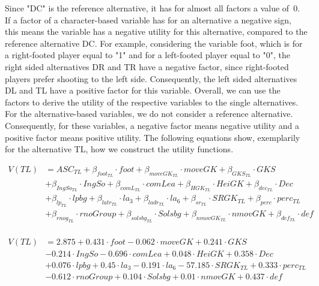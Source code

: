 \documentclass[12pt,dvipsnames]{article}%
\begin{document}
 \vspace{-0.2cm}
 
 Since "DC" is the reference alternative, it has for almost all factors a value \mbox{of 0.} If a factor of a character-based variable has for an alternative a negative sign, this means the variable has a negative utility for this alternative, compared to the reference alternative DC. For example, considering the variable foot, which is for a right-footed player equal to "1" and for a left-footed player equal to "0", the right sided alternatives DR and TR have a negative factor, since right-footed players prefer shooting to the left side. Consequently, the left sided alternatives DL and TL have a positive factor for this variable. Overall, we can use the factors to derive the utility of the respective variables to the single alternatives. \\
For the alternative-based variables, we do not consider a reference alternative. Consequently, for these variables, a negative factor means negative utility and a positive factor means positive utility. The following equations show, exemplarily for the alternative TL, how we construct the utility functions. 
 
 \vspace{-1.2cm}
 
 \begin{center}
 \begin{small}
\begin{align*}
V(TL) &= ASC_{TL} + \beta_{foot_{TL}} \cdot foot + \beta_{moveGK_{TL}} \cdot moveGK  + \beta_{GKS_{TL}} \cdot GKS \\ &+ \beta_{IngSo_{TL}} \cdot IngSo  + \beta_{comL_{TL}} \cdot comLea  + \beta_{HGK_{TL}} \cdot HeiGK + \beta_{dec_{TL}} \cdot Dec \\ &+ \beta_{lp_{TL}} \cdot lpbg  + \beta_{latr_{TL}} \cdot la_{3}  + \beta_{ladr_{TL}} \cdot la_{6} + \beta_{sr_{TL}} \cdot SRGK_{TL} + \beta_{perc} \cdot perc_{TL} \\ &+ \beta_{rnog_{TL}} \cdot rnoGroup  + \beta_{solsbg_{TL}} \cdot Solsbg + \beta_{nmovGK_{TL}} \cdot nmovGK + \beta_{def_{TL}} \cdot def  \\
\end{align*}
\end{small}
\end{center}

 \begin{center}
 \begin{small}
\begin{align*}
V(TL) &= 2.875 + 0.431 \cdot foot - 0.062 \cdot moveGK  + 0.241 \cdot GKS \\ &- 0.214 \cdot IngSo   - 0.696  \cdot comLea  + 0.048 \cdot HeiGK + 0.358 \cdot Dec \\ &+ 0.076 \cdot lpbg  + 0.45 \cdot la_{3}  - 0.191 \cdot la_{6} - 57.185  \cdot SRGK_{TL} + 0.333 \cdot perc_{TL} \\ &- 0.612 \cdot rnoGroup  + 0.104 \cdot Solsbg + 0.01 \cdot nmovGK + 0.437 \cdot def  \\
\end{align*}
\end{small}
\end{center}
\end{document}
